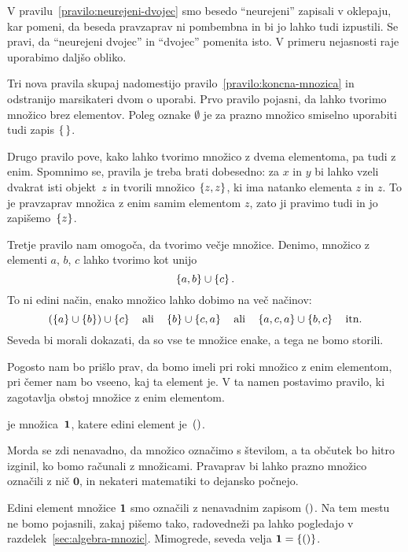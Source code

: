 V pravilu~\ref{pravilo:neurejeni-dvojec} smo besedo ``neurejeni'' zapisali v oklepaju, kar
pomeni, da beseda pravzaprav ni pombembna in bi jo lahko tudi izpustili. Se pravi, da
``neurejeni dvojec'' in ``dvojec'' pomenita isto. V primeru nejasnosti raje uporabimo
daljšo obliko.

Tri nova pravila skupaj nadomestijo pravilo~\ref{pravilo:koncna-mnozica} in odstranijo
marsikateri dvom o uporabi. Prvo pravilo pojasni, da lahko tvorimo množico brez elementov.
Poleg oznake $\emptyset$ je za prazno množico smiselno uporabiti tudi zapis $\set{\,}$.

Drugo pravilo pove, kako lahko tvorimo množico z dvema elementoma, pa tudi z enim.
Spomnimo se, pravila je treba brati dobesedno: za $x$ in $y$ bi lahko vzeli dvakrat isti
objekt~$z$ in tvorili množico $\set{z, z}$, ki ima natanko elementa $z$ in $z$. To je
pravzaprav množica z enim samim elementom $z$, zato ji pravimo tudi  in jo
zapišemo~$\set{z}$.

Tretje pravilo nam omogoča, da tvorimo večje množice. Denimo, množico z elementi $a$, $b$,
$c$ lahko tvorimo kot unijo
%
\begin{equation*}
  \set{a, b} \cup \set{c}.
\end{equation*}
%
To ni edini način, enako množico lahko dobimo na več načinov:
%
\begin{equation*}
  (\set{a} \cup \set{b}) \cup \set{c}
  \quad\text{ali}\quad
  \set{b} \cup \set{c, a}
  \quad\text{ali}\quad
  \set{a,c,a} \cup \set{b,c}
  \quad\text{itn.}
\end{equation*}
%
Seveda bi morali dokazati, da so vse te množice enake, a tega ne bomo storili.

Pogosto nam bo prišlo prav, da bomo imeli pri roki množico z enim elementom, pri čemer nam
bo vseeno, kaj ta element je. V ta namen postavimo pravilo, ki zagotavlja obstoj množice z
enim elementom.

\begin{pravilo}
  \label{pravilo:enojec}
   je množica~$\mathtt{\mathbf{1}}$, katere edini element je~$\mathord{()}$.
\end{pravilo}

Morda se zdi nenavadno, da množico označimo s številom, a ta občutek bo hitro izginil, ko
bomo računali z množicami. Pravaprav bi lahko prazno množico označili z nič $\mathbf{0}$,
in nekateri matematiki to dejansko počnejo.

Edini element množice $\mathtt{\mathbf{1}}$ smo označili z nenavadnim zapisom $\mathord{()}$. Na tem mestu ne
bomo pojasnili, zakaj pišemo tako, radovedneži pa lahko pogledajo v
razdelek~\ref{sec:algebra-mnozic}. Mimogrede, seveda velja $\one = \set{\unit}$.

